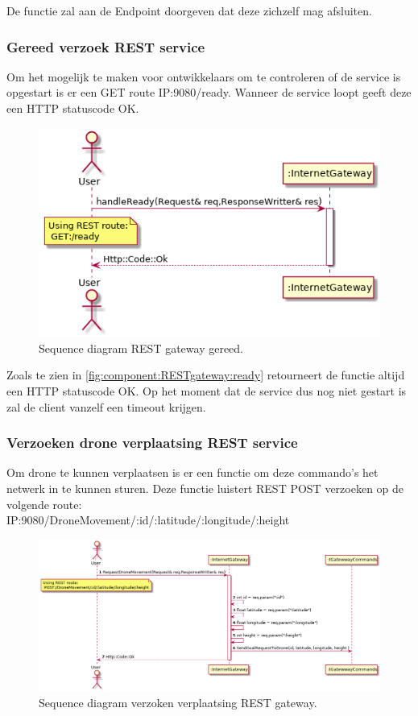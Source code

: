 \documentclass[a4paper, 11pt, oneside]{report}
\begin{document}
De functie zal aan de Endpoint doorgeven dat deze zichzelf mag afsluiten.


\subsubsection{Gereed verzoek REST service}
Om het mogelijk te maken voor ontwikkelaars om te controleren of de service is opgestart is er een GET route IP:9080/ready.
Wanneer de service loopt geeft deze een HTTP statuscode OK.

\begin{figure}[H]
	\begin{center}\includegraphics[width=.5\linewidth]{UML/out/REST/sequence/ready/ready.png}\end{center}
	\caption{Sequence diagram REST gateway gereed.}
	\label{fig:component:RESTgateway:ready}
\end{figure}

Zoals te zien in \autoref{fig:component:RESTgateway:ready} retourneert de functie altijd een HTTP statuscode OK.
Op het moment dat de service dus nog niet gestart is zal de client vanzelf een timeout krijgen.


\subsubsection{Verzoeken drone verplaatsing REST service}
Om drone te kunnen verplaatsen is er een functie om deze commando's het netwerk in te kunnen sturen.
Deze functie luistert REST POST verzoeken op de volgende route:  \\IP:9080/DroneMovement/:id/:latitude/:longitude/:height


\begin{figure}[H]
	\begin{center}\includegraphics[width=\linewidth]{UML/out/REST/sequence/RequestDroneMovement/RequestDroneMovement.png}\end{center}
	\caption{Sequence diagram verzoken verplaatsing REST gateway.}
	\label{fig:component:RESTgateway:movement}
\end{figure}
\end{document}
